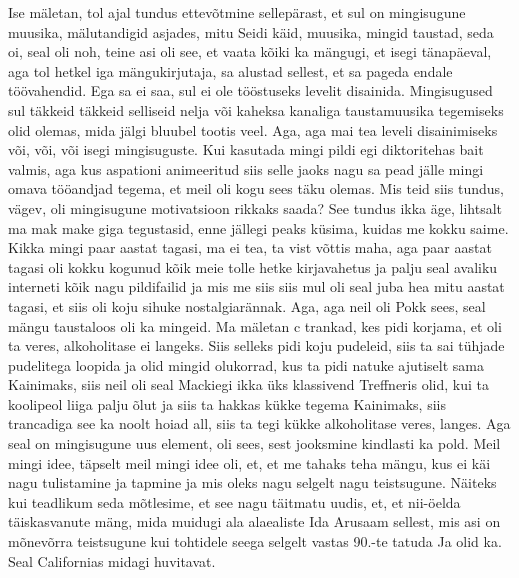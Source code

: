Ise mäletan, tol ajal tundus ettevõtmine sellepärast, et sul on mingisugune muusika, mälutandigid asjades, mitu Seidi käid, muusika, mingid taustad, seda oi, seal oli noh, teine asi oli see, et vaata kõiki ka mängugi, et isegi tänapäeval, aga tol hetkel iga mängukirjutaja, sa alustad sellest, et sa pageda endale töövahendid. Ega sa ei saa, sul ei ole tööstuseks levelit disainida. Mingisugused sul täkkeid täkkeid selliseid nelja või kaheksa kanaliga taustamuusika tegemiseks olid olemas, mida jälgi bluubel tootis veel. Aga, aga mai tea leveli disainimiseks või, või, või isegi mingisuguste. Kui kasutada mingi pildi egi diktoritehas bait valmis, aga kus aspationi animeeritud siis selle jaoks nagu sa pead jälle mingi omava tööandjad tegema, et meil oli kogu sees täku olemas.
Mis teid siis tundus, vägev, oli mingisugune motivatsioon rikkaks saada? See tundus ikka äge, lihtsalt ma mak make giga tegustasid, enne jällegi peaks küsima, kuidas me kokku saime.
Kikka mingi paar aastat tagasi, ma ei tea, ta vist võttis maha, aga paar aastat tagasi oli kokku kogunud kõik meie tolle hetke kirjavahetus ja palju seal avaliku interneti kõik nagu pildifailid ja mis me siis siis mul oli seal juba hea mitu aastat tagasi, et siis oli koju sihuke nostalgiarännak. Aga, aga neil oli Pokk sees, seal mängu taustaloos oli ka mingeid. Ma mäletan c trankad, kes pidi korjama, et oli ta veres, alkoholitase ei langeks. Siis selleks pidi koju pudeleid, siis ta sai tühjade pudelitega loopida ja olid mingid olukorrad, kus ta pidi natuke ajutiselt sama Kainimaks, siis neil oli seal Mackiegi ikka üks klassivend Treffneris olid, kui ta koolipeol liiga palju õlut ja siis ta hakkas kükke tegema Kainimaks, siis trancadiga see ka noolt hoiad all, siis ta tegi kükke alkoholitase veres, langes.
Aga seal on mingisugune uus element, oli sees, sest jooksmine kindlasti ka pold. Meil mingi idee, täpselt meil mingi idee oli, et, et me tahaks teha mängu, kus ei käi nagu tulistamine ja tapmine ja mis oleks nagu selgelt nagu teistsugune.
Näiteks kui teadlikum seda mõtlesime, et see nagu täitmatu uudis, et, et nii-öelda täiskasvanute mäng, mida muidugi ala alaealiste Ida
Arusaam sellest, mis asi on mõnevõrra teistsugune kui tohtidele seega selgelt vastas 90.-te tatuda
Ja olid ka.
Seal Californias midagi huvitavat.
